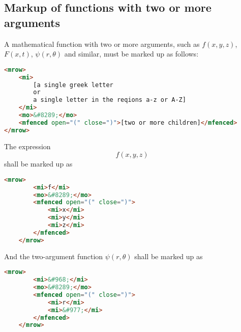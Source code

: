 \documentclass[english,a4paper,11pt]{article}
\begin{document}
\subsection{Markup of functions with two or more arguments}
A mathematical function with two or more arguments, such as $f(x,y,z)$, $F(x,t)$, $\psi (r, \theta )$ and similar, must be marked up as follows:
\begin{lstlisting}[language=HTML]
<mrow>
	<mi>
		[a single greek letter 
		or 
		a single letter in the reqions a-z or A-Z]
	</mi>
	<mo>&#8289;</mo>
	<mfenced open="(" close=")">[two or more children]</mfenced>
</mrow>
\end{lstlisting}


\begin{examples}
	The expression 
	\begin{equation}f(x,y,z)\end{equation}
	shall be marked up as
	\begin{lstlisting}[language=HTML]
	<mrow>
		<mi>f</mi>
		<mo>&#8289;</mo>
		<mfenced open="(" close=")">
			<mi>x</mi>
			<mi>y</mi>
			<mi>z</mi>
		</mfenced>
	</mrow>
	\end{lstlisting}
	
	And the two-argument function 
	$\psi (r, \theta )$
	shall be marked up as
	\begin{lstlisting}[language=HTML]
	<mrow>
		<mi>&#968;</mi>
		<mo>&#8289;</mo>
		<mfenced open="(" close=")">
			<mi>r</mi>
			<mi>&#977;</mi>
		</mfenced>
	</mrow>
	\end{lstlisting}
\end{examples}
\end{document}
